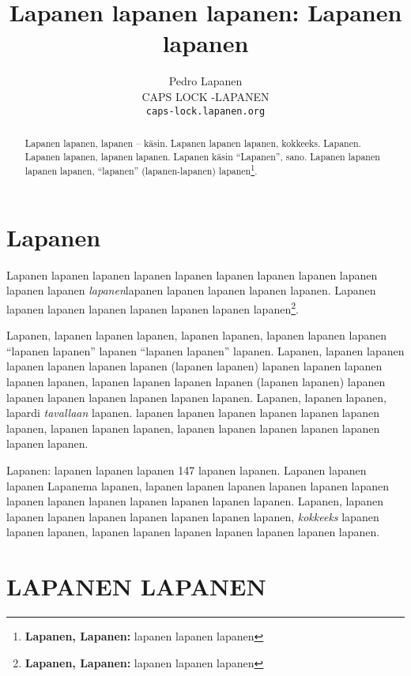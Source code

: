 \documentclass[a4paper]{article}
\title{Lapanen lapanen lapanen: Lapanen lapanen}
\date{}
\author{Pedro Lapanen\\CAPS LOCK -LAPANEN\\\texttt{caps-lock.lapanen.org}}
\begin{document}
\maketitle

\begin{multicols}{2}


\renewcommand{\abstractname}{Lapaslapanen}

\begin{abstract}

Lapanen lapanen, lapanen -- käsin. Lapanen lapanen lapanen, kokkeeks. Lapanen. Lapanen lapanen, lapanen lapanen.
Lapanen käsin ``Lapanen'', sano. Lapanen lapanen lapanen lapanen, ``lapanen'' (lapanen-lapanen)
lapanen\footnote{\textbf{Lapanen, Lapanen:} lapanen lapanen lapanen}.

\end{abstract}


\section{Lapanen}

Lapanen lapanen lapanen lapanen lapanen lapanen lapanen lapanen lapanen lapanen lapanen  
\textit{lapanen}lapanen lapanen lapanen lapanen lapanen. 
Lapanen lapanen lapanen lapanen lapanen lapanen lapanen lapanen\footnote{\textbf{Lapanen, Lapanen:} lapanen lapanen
lapanen}.

Lapanen, lapanen lapanen lapanen, lapanen lapanen, lapanen lapanen lapanen ``lapanen lapanen'' lapanen ``lapanen
lapanen'' lapanen. Lapanen, lapanen lapanen lapanen lapanen lapanen lapanen (lapanen lapanen)\cite{lapanen} lapanen
lapanen lapanen lapanen lapanen, lapanen lapanen lapanen lapanen (lapanen lapanen) lapanen lapanen lapanen lapanen
lapanen lapanen lapanen. Lapanen, lapanen lapanen, lapardi \textit{tavallaan} lapanen. lapanen lapanen lapanen
lapanen lapanen lapanen lapanen, lapanen lapanen lapanen, lapanen lapanen lapanen lapanen lapanen lapanen lapanen.


Lapanen: lapanen lapanen lapanen 147 lapanen lapanen. Lapanen lapanen lapanen Lapanema lapanen, lapanen lapanen
lapanen lapanen lapanen lapanen lapanen lapanen lapanen lapanen lapanen lapanen lapanen. Lapanen, lapanen lapanen
lapanen lapanen lapanen lapanen \cite{liplap} lapanen lapanen, \textit{kokkeeks} lapanen lapanen lapanen, lapanen
lapanen lapanen lapanen lapanen lapanen lapanen.


\section{LAPANEN LAPANEN}


\end{multicols}
\end{document}
